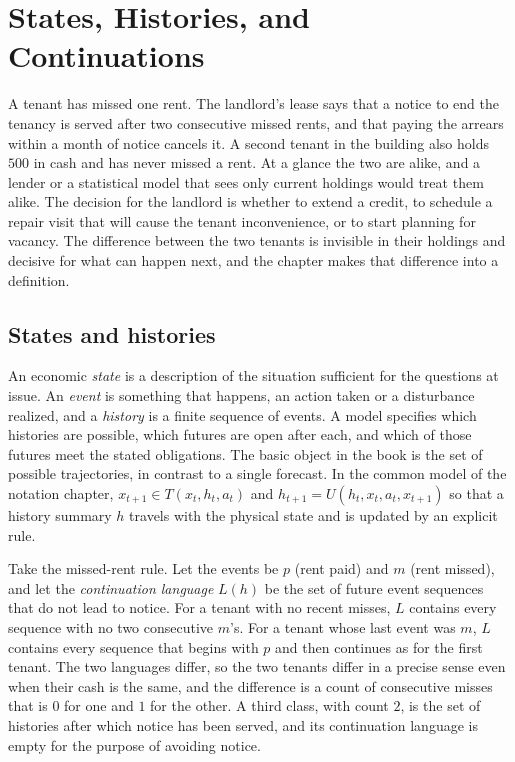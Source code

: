 \chapter{States, Histories, and Continuations}\label{ch:2}

A tenant has missed one rent. The landlord's lease says that a notice to end the tenancy is served after two consecutive missed rents, and that paying the arrears within a month of notice cancels it. A second tenant in the building also holds $500$ in cash and has never missed a rent. At a glance the two are alike, and a lender or a statistical model that sees only current holdings would treat them alike. The decision for the landlord is whether to extend a credit, to schedule a repair visit that will cause the tenant inconvenience, or to start planning for vacancy. The difference between the two tenants is invisible in their holdings and decisive for what can happen next, and the chapter makes that difference into a definition.

\section{States and histories}

An economic \emph{state} is a description of the situation sufficient for the questions at issue. An \emph{event} is something that happens, an action taken or a disturbance realized, and a \emph{history} is a finite sequence of events. A model specifies which histories are possible, which futures are open after each, and which of those futures meet the stated obligations. The basic object in the book is the set of possible trajectories, in contrast to a single forecast. In the common model of the notation chapter, $x_{t+1}\in T(x_t,h_t,a_t)$ and $h_{t+1}=U(h_t,x_t,a_t,x_{t+1})$ so that a history summary $h$ travels with the physical state and is updated by an explicit rule.

Take the missed-rent rule. Let the events be $p$ (rent paid) and $m$ (rent missed), and let the \emph{continuation language} $L(h)$ be the set of future event sequences that do not lead to notice. For a tenant with no recent misses, $L$ contains every sequence with no two consecutive $m$'s. For a tenant whose last event was $m$, $L$ contains every sequence that begins with $p$ and then continues as for the first tenant. The two languages differ, so the two tenants differ in a precise sense even when their cash is the same, and the difference is a count of consecutive misses that is $0$ for one and $1$ for the other. A third class, with count $2$, is the set of histories after which notice has been served, and its continuation language is empty for the purpose of avoiding notice.

